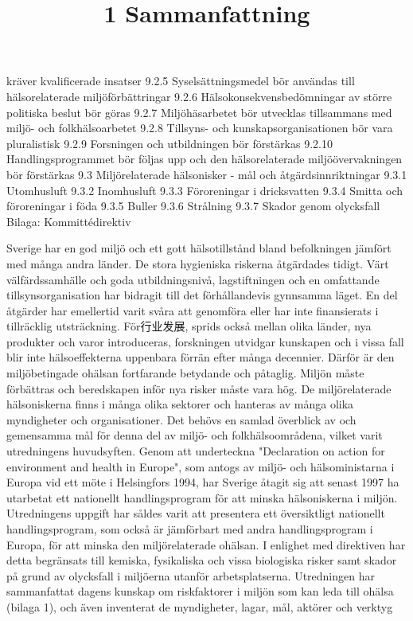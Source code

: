 kräver kvalificerade insatser
9.2.5 Syselsättningsmedel bör användas till
hälsorelaterade miljöförbättringar
9.2.6 Hälsokonsekvensbedömningar av större politiska beslut bör göras
9.2.7 Miljöhäsarbetet bör utvecklas tillsammans med miljö- och folkhälsoarbetet
9.2.8 Tillsyns- och kunskapsorganisationen bör vara pluralistisk
9.2.9 Forsningen och utbildningen bör förstärkas
9.2.10 Handlingsprogrammet bör följas upp och den hälsorelaterade miljöövervakningen bör förstärkas
9.3 Miljörelaterade hälsonisker - mål och åtgärdsinnriktningar
9.3.1 Utomhusluft
9.3.2 Inomhusluft
9.3.3 Föroreningar i dricksvatten
9.3.4 Smitta och föroreningar i föda
9.3.5 Buller
9.3.6 Strålning
9.3.7 Skador genom olycksfall
Bilaga: Kommittédirektiv

\title{
1 Sammanfattning
}
Sverige har en god miljö och ett gott hälsotillstånd bland befolkningen jämfört med många andra länder. De stora hygieniska riskerna åtgärdades tidigt. Värt välfärdssamhälle och goda utbildningsnivå, lagstiftningen och en omfattande tillsynsorganisation har bidragit till det förhållandevis gynnsamma läget. En del åtgärder har emellertid varit svåra att genomföra eller har inte finansierats i tillräcklig utsträckning. För行业发展, sprids också mellan olika länder, nya produkter och varor introduceras, forskningen utvidgar kunskapen och i vissa fall blir inte hälsoeffekterna uppenbara förrän efter många decennier. Därför är den miljöbetingade ohälsan fortfarande betydande och påtaglig. Miljön måste förbättras och beredskapen inför nya risker måste vara hög.
De miljörelaterade hälsoniskerna finns i många olika sektorer och hanteras av många olika myndigheter och organisationer. Det behövs en samlad överblick av och gemensamma mål för denna del av miljö- och folkhälsoområdena, vilket varit utredningens huvudsyften. Genom att underteckna "Declaration on action for environment and health in Europe", som antogs av miljö- och hälsoministarna i Europa vid ett möte i Helsingfors 1994, har Sverige åtagit sig att senast 1997 ha utarbetat ett nationellt handlingsprogram för att minska hälsoniskerna i miljön.
Utredningens uppgift har såldes varit att presentera ett översiktligt nationellt handlingsprogram, som också är jämförbart med andra handlingsprogram i Europa, för att minska den miljörelaterade ohälsan. I enlighet med direktiven har detta begränsats till kemiska, fysikaliska och vissa biologiska risker samt skador på grund av olycksfall i miljöerna utanför arbetsplatserna. Utredningen har sammanfattat dagens kunskap om riskfaktorer i miljön som kan leda till ohälsa (bilaga 1), och även inventerat de myndigheter, lagar, mål, aktörer och verktyg

